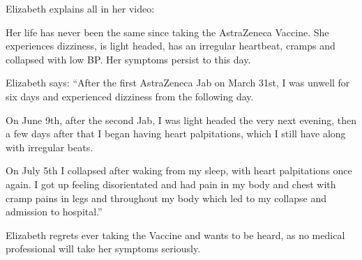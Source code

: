 Elizabeth explains all in her video:

Her life has never been the same since taking the AstraZeneca Vaccine. She
experiences dizziness, is light headed, has an irregular heartbeat, cramps and
collapsed with low BP. Her symptoms persist to this day.

Elizabeth says: “After the first AstraZeneca Jab on March 31st, I was unwell for
six days and experienced dizziness from the following day.

On June 9th, after the second Jab, I was light headed the very next evening,
then a few days after that I began having heart palpitations, which I still have
along with irregular beats.

On July 5th I collapsed after waking from my sleep, with heart palpitations once
again. I got up feeling disorientated and had pain in my body and chest with
cramp pains in legs and throughout my body which led to my collapse and
admission to hospital.”

Elizabeth regrets ever taking the Vaccine and wants to be heard, as no medical
professional will take her symptoms seriously.

